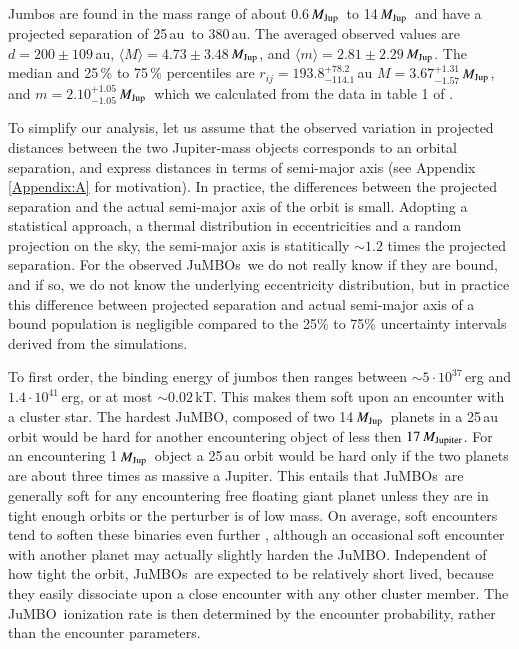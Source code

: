 \documentclass[submission,phys]{lib/SciPost}
\newcommand{\MJup}{\mbox{${M}_{\rm Jup}$}}
\newcommand{\jumbo}{\mbox{JuMBO}}
\newcommand{\jumbos}{\mbox{JuMBOs}}
\begin{document}
Jumbos are found in the mass range of about 0.6\,\MJup\, to
14\,\MJup\, and have a projected separation of 25\,au\, to $380$\,au.
The averaged observed values are $d=200\pm109$\,au, $\langle M\rangle
= 4.73\pm3.48$\,\MJup, and $\langle m\rangle =
2.81\pm2.29$\,\MJup. The median and 25\,\% to 75\,\% percentiles are
$r_{ij} = 193.8^{+78.2}_{-114.1}$\,au $M =
3.67^{+1.31}_{-1.57}$\,\MJup, and $m = 2.10^{+1.05}_{-1.05}$\,\MJup\,
which we calculated from the data in table 1 of
\cite{2023arXiv231001231P}.

To simplify our analysis, let us assume that the observed variation in
projected distances between the two Jupiter-mass objects corresponds
to an orbital separation, and express distances in terms of semi-major
axis (see Appendix\,\ref{Appendix:A} for motivation).  In practice,
the differences between the projected separation and the actual
semi-major axis of the orbit is small. Adopting a statistical
approach, a thermal distribution in eccentricities and a random
projection on the sky, the semi-major axis is statitically $\sim 1.2$
times the projected separation.  For the observed \jumbos\, we do not
really know if they are bound, and if so, we do not know the
underlying eccentricity distribution, but in practice this difference
between projected separation and actual semi-major axis of a bound
population is negligible compared to the 25\% to 75\% uncertainty
intervals derived from the simulations.

To first order, the binding energy of jumbos then ranges between $\sim
5\cdot 10^{37}$\,erg and $1.4\cdot 10^{41}$\,erg, or at most $\sim
0.02$\,kT. This makes them soft upon an encounter with a cluster star.
The hardest \jumbo, composed of two 14\,\MJup\, planets in a 25\,au
orbit would be hard for another encountering object of less then
$17\,M_{\rm Jupiter}$.  For an encountering 1\,\MJup\, object a 25\,au
orbit would be hard only if the two planets are about three times as
massive a Jupiter.  This entails that \jumbos\, are generally soft for
any encountering free floating giant planet unless they are in tight
enough orbits or the perturber is of low mass.  On average, soft
encounters tend to soften these binaries even further
\cite{1975MNRAS.173..729H}, although an occasional soft encounter with
another planet may actually slightly harden the \jumbo.  Independent
of how tight the orbit, \jumbos\, are expected to be relatively short
lived, because they easily dissociate upon a close encounter with any
other cluster member.  The \jumbo\, ionization rate is then determined
by the encounter probability, rather than the encounter parameters.
\end{document}
